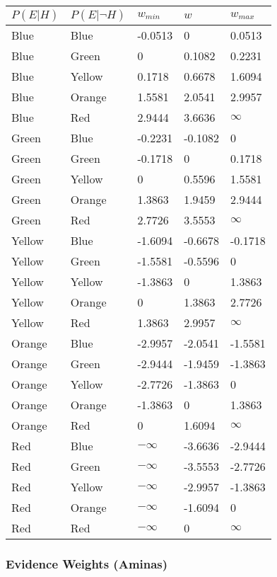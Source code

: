 \documentclass[
]{article}
\begin{document}
\begin{longtable}[]{@{}lllll@{}}
\toprule\noalign{}
\(P(E|H)\) & \(P(E|\neg H)\) & \(w_{min}\) & \(w\) & \(w_{max}\) \\
\midrule\noalign{}
\endhead
\bottomrule\noalign{}
\endlastfoot
Blue & Blue & -0.0513 & 0 & 0.0513 \\
Blue & Green & 0 & 0.1082 & 0.2231 \\
Blue & Yellow & 0.1718 & 0.6678 & 1.6094 \\
Blue & Orange & 1.5581 & 2.0541 & 2.9957 \\
Blue & Red & 2.9444 & 3.6636 & \(\infty\) \\
Green & Blue & -0.2231 & -0.1082 & 0 \\
Green & Green & -0.1718 & 0 & 0.1718 \\
Green & Yellow & 0 & 0.5596 & 1.5581 \\
Green & Orange & 1.3863 & 1.9459 & 2.9444 \\
Green & Red & 2.7726 & 3.5553 & \(\infty\) \\
Yellow & Blue & -1.6094 & -0.6678 & -0.1718 \\
Yellow & Green & -1.5581 & -0.5596 & 0 \\
Yellow & Yellow & -1.3863 & 0 & 1.3863 \\
Yellow & Orange & 0 & 1.3863 & 2.7726 \\
Yellow & Red & 1.3863 & 2.9957 & \(\infty\) \\
Orange & Blue & -2.9957 & -2.0541 & -1.5581 \\
Orange & Green & -2.9444 & -1.9459 & -1.3863 \\
Orange & Yellow & -2.7726 & -1.3863 & 0 \\
Orange & Orange & -1.3863 & 0 & 1.3863 \\
Orange & Red & 0 & 1.6094 & \(\infty\) \\
Red & Blue & \(-\infty\) & -3.6636 & -2.9444 \\
Red & Green & \(-\infty\) & -3.5553 & -2.7726 \\
Red & Yellow & \(-\infty\) & -2.9957 & -1.3863 \\
Red & Orange & \(-\infty\) & -1.6094 & 0 \\
Red & Red & \(-\infty\) & 0 & \(\infty\) \\
\end{longtable}

\pagebreak

\subsubsection{Evidence Weights (Aminas)}\label{evidence-weights-aminas}
\end{document}
